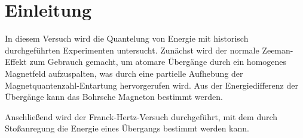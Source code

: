\section{Einleitung}\label{sec:einleitung}

In diesem Versuch wird die Quantelung von Energie mit historisch durchgeführten Experimenten untersucht.
Zunächst wird der normale Zeeman-Effekt zum Gebrauch gemacht, um atomare Übergänge durch ein homogenes Magnetfeld
aufzuspalten, was durch eine partielle Aufhebung der Magnetquantenzahl-Entartung hervorgerufen wird. Aus
der Energiedifferenz der Übergänge kann das Bohrsche Magneton bestimmt werden.\par
Anschließend wird der Franck-Hertz-Versuch durchgeführt, mit dem durch
Stoßanregung die Energie eines Übergangs bestimmt werden kann.